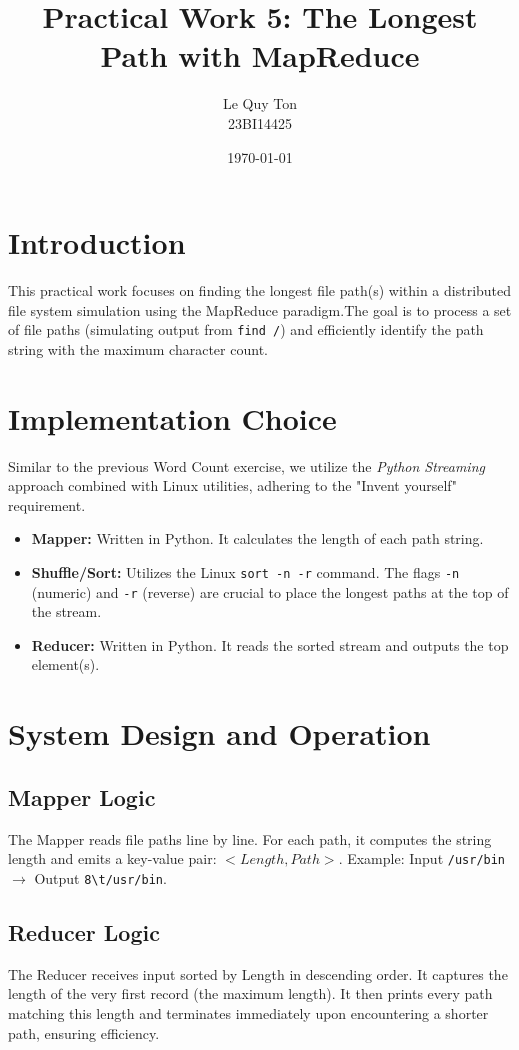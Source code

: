\documentclass[a4paper,12pt]{article}
\title{Practical Work 5: The Longest Path with MapReduce}
\author{Le Quy Ton \\ 23BI14425}
\date{\today}
\begin{document}
\maketitle

\section{Introduction}
This practical work focuses on finding the longest file path(s) within a distributed file system simulation using the MapReduce paradigm.The goal is to process a set of file paths (simulating output from \texttt{find /}) and efficiently identify the path string with the maximum character count.

\section{Implementation Choice}
Similar to the previous Word Count exercise, we utilize the \emph{Python Streaming} approach combined with Linux utilities, adhering to the "Invent yourself" requirement.

\begin{itemize}
    \item \textbf{Mapper:} Written in Python. It calculates the length of each path string.
    \item \textbf{Shuffle/Sort:} Utilizes the Linux \texttt{sort -n -r} command. The flags \texttt{-n} (numeric) and \texttt{-r} (reverse) are crucial to place the longest paths at the top of the stream.
    \item \textbf{Reducer:} Written in Python. It reads the sorted stream and outputs the top element(s).
\end{itemize}

\section{System Design and Operation}

\subsection{Mapper Logic}
The Mapper reads file paths line by line. For each path, it computes the string length and emits a key-value pair: $<Length, Path>$.
Example: Input \texttt{/usr/bin} $\rightarrow$ Output \texttt{8\textbackslash t/usr/bin}.

\subsection{Reducer Logic}
The Reducer receives input sorted by Length in descending order. It captures the length of the very first record (the maximum length). It then prints every path matching this length and terminates immediately upon encountering a shorter path, ensuring efficiency.
\end{document}
